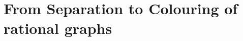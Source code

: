 \section{%
	\AP\label{sec:dichotomy-colouring}%
	From Separation to Colouring of rational graphs
}



